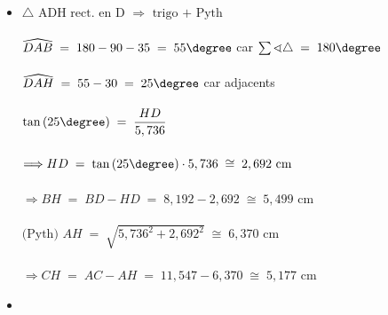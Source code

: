 \begin{itemize}
	$\widehat{BAC}\;=\;180-90-60\;=\;30\degree$ car $\sum \sphericalangle \triangle \;=\; 180\degree$\\
	$ $\\
	$\widehat{BGA}\;=\;180-15-30\;=\;135\degree $ car $\sum \sphericalangle \triangle \;=\; 180\degree$\\
	$ $\\
	$\widehat{AGF}\;=\;180-135\;=\;45\degree$ car supplémentaires\\
	$ $\\
	$\tan{(45\degree)}\;=\;\dfrac{2,588}{GE}$\\
	$ $\\
	$\Longrightarrow GE\;=\;\dfrac{2,588}{\tan{(45\degree)}}\;\cong\;2,588\mbox{ cm}$\\
	$ $\\
	$\mbox{(Pyth) }  AG\;=\;\sqrt{2,588^2+2,588^2}\;\cong\;3,660\mbox{ cm}$\\
	$ $\\	
	$\Longrightarrow BG\;=\;BE-GE\;=\;9,659-2,588\;\cong\;5,681\mbox{ cm}$\\
	$ $\\
	\item[$\bullet$]
	$\triangle\mbox{ ADH rect. en D }\Rightarrow\mbox{ trigo + Pyth }$\\
	$ $\\
	$\widehat{DAB}\;=\;180-90-35\;=\;55\degree$ car $\sum \sphericalangle \triangle \;=\; 180\degree$\\
	$ $\\
	$\widehat{DAH}\;=\;55-30\;=\;25\degree$ car adjacents\\
	$ $\\
	$\tan{(25\degree)}\;=\;\dfrac{HD}{5,736}$\\
	$ $\\
	$\Longrightarrow HD\;=\;\tan{(25\degree)}\cdot5,736\;\cong\;2,692\mbox{ cm}$\\
	$ $\\
	$\Longrightarrow BH\;=\;BD-HD\;=\;8,192-2,692\;\cong\;5,499\mbox{ cm}$\\
	$ $\\
	$\mbox{(Pyth) }  AH\;=\;\sqrt{5,736^2+2,692^2}\;\cong\;6,370\mbox{ cm}$\\
	$ $\\
	$\Longrightarrow CH\;=\;AC-AH\;=\;11,547-6,370\;\cong\;5,177\mbox{ cm}$\\
	\newpage
	\item[$\bullet$]

\end{itemize}
